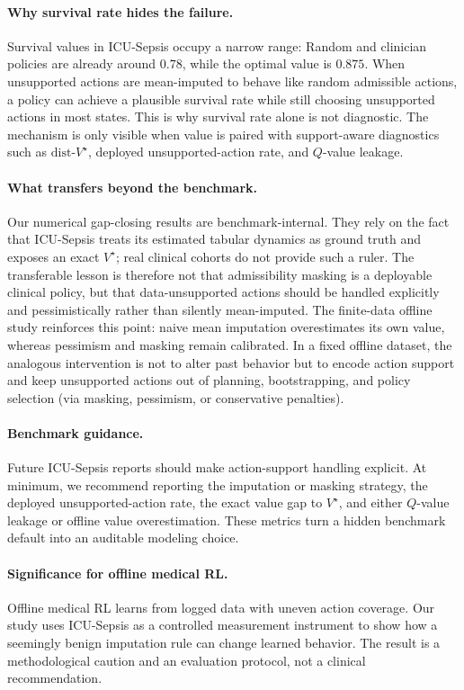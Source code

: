\documentclass{article}
\newcommand{\dist}{\mathrm{dist}\text{-}V^\star}
\begin{document}
\paragraph{Why survival rate hides the failure.}
Survival values in ICU-Sepsis occupy a narrow range: Random and clinician policies
are already around $0.78$, while the optimal value is $0.875$. When unsupported
actions are mean-imputed to behave like random admissible actions, a policy can
achieve a plausible survival rate while still choosing unsupported actions in most
states. This is why survival rate alone is not diagnostic. The mechanism is only
visible when value is paired with support-aware diagnostics such as $\dist$,
deployed unsupported-action rate, and $Q$-value leakage.

\paragraph{What transfers beyond the benchmark.}
Our numerical gap-closing results are benchmark-internal. They rely on the fact
that ICU-Sepsis treats its estimated tabular dynamics as ground truth and exposes
an exact $V^\star$; real clinical cohorts do not provide such a ruler. The
transferable lesson is therefore not that admissibility masking is a deployable
clinical policy, but that data-unsupported actions should be handled explicitly
and pessimistically rather than silently mean-imputed. The finite-data offline
study reinforces this point: naive mean imputation overestimates its own value,
whereas pessimism and masking remain calibrated. In a fixed offline dataset, the
analogous intervention is not to alter past behavior but to encode action support
and keep unsupported actions out of planning, bootstrapping, and policy selection
(via masking, pessimism, or conservative penalties).

\paragraph{Benchmark guidance.}
Future ICU-Sepsis reports should make action-support handling explicit. At minimum,
we recommend reporting the imputation or masking strategy, the deployed
unsupported-action rate, the exact value gap to $V^\star$, and either $Q$-value
leakage or offline value overestimation. These metrics turn a hidden benchmark
default into an auditable modeling choice.

\paragraph{Significance for offline medical RL.}
Offline medical RL learns from logged data with uneven action coverage. Our study
uses ICU-Sepsis as a controlled measurement instrument to show how a seemingly
benign imputation rule can change learned behavior. The result is a methodological
caution and an evaluation protocol, not a clinical recommendation.
\end{document}
